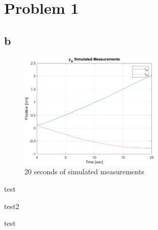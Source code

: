 
\section{Problem 1}
\subsection{b}
\lipsum[23-27]
\begin{figure}[h!tbp]
    \centering
    \includegraphics[width=0.6\textwidth]{figs/p2pa.png}
    \caption{20 seconds of simulated measurements}
    \label{fig:p2_a}
\end{figure}

\begin{definition}[test]
    test
\end{definition}

\begin{theorem}[test]
    test2
\end{theorem}

\begin{eg}[test]
    test
\end{eg}